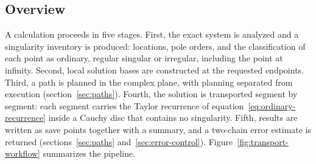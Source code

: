 \documentclass[11pt,a4paper]{article}
\begin{document}
\subsection{Overview}
\label{sec:overview}

A calculation proceeds in five stages. First, the exact system is analyzed and a
singularity inventory is produced: locations, pole orders, and the classification of each
point as ordinary, regular singular or irregular, including the point at
infinity. Second, local solution bases are constructed at the requested endpoints. Third,
a path is planned in the complex plane, with planning separated from execution
(section~\ref{sec:paths}). Fourth, the solution is transported segment by segment: each
segment carries the Taylor recurrence of equation~\eqref{eq:ordinary-recurrence} inside a
Cauchy disc that contains no singularity. Fifth, results are written as save points
together with a summary, and a two-chain error estimate is returned
(sections~\ref{sec:paths} and~\ref{sec:error-control}). Figure~\ref{fig:transport-workflow}
summarizes the pipeline.
\end{document}

